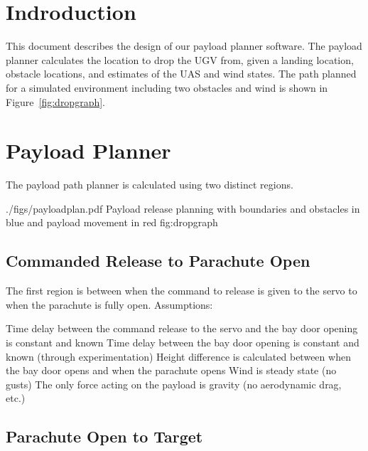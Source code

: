 \documentclass[]{auvsi_doc}
\begin{document}
\begin{AUVSITitlePage}
\begin{artifacttable}
\end{artifacttable}
\end{AUVSITitlePage}


\section{Indroduction}
This document describes the design of our payload planner software. The payload planner calculates the location to drop the UGV from, given a landing location, obstacle locations, and estimates of the UAS and wind states.
The path planned for a simulated environment including two obstacles and wind is shown in Figure~\ref{fig:dropgraph}.
\section{Payload Planner}

The payload path planner is calculated using two distinct regions.


\AUVSIFigure
{./figs/payloadplan.pdf}
{\textwidth}
{Payload release planning with boundaries and obstacles in blue and payload movement in red}
{fig:dropgraph}

\subsection{Commanded Release to Parachute Open}

The first region is between when the command to release is given to the servo to when the parachute is fully open. Assumptions:

    Time delay between the command release to the servo and the bay door opening is constant and known
    Time delay between the bay door opening is constant and known (through experimentation)
    Height difference is calculated between when the bay door opens and when the parachute opens
    Wind is steady state (no gusts)
    The only force acting on the payload is gravity (no aerodynamic drag, etc.)

\subsection{Parachute Open to Target}
\end{document}
